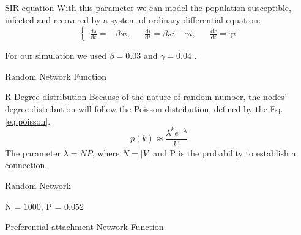 \documentclass{beamer}
\begin{document}
	\begin{frame}{SIR equation}
	    With this parameter we can model the population susceptible, infected and recovered by a system of ordinary differential equation:
	    \begin{equation}\label{eq:diffEq}
          \left\{
            \begin{matrix}
                \frac{\mathrm{d} s}{\mathrm{d} t} = -\beta si, &&
                \frac{\mathrm{d} i}{\mathrm{d} t} = \beta si - \gamma i, &&
                \frac{\mathrm{d} r}{\mathrm{d} t} = \gamma i
            \end{matrix}\right.
        \end{equation}
        \begin{center}
		\end{center}
		
		For our simulation we used $\beta = 0.03$ and $\gamma = 0.04$ .
	\end{frame}
	
	\begin{frame}{Random Network Function}
        \begin{adjustwidth}{-1cm}{-1cm}
		\end{adjustwidth}
	\end{frame}
	
	\begin{frame}{R Degree distribution}
		Because of the nature of random number, the nodes' degree distribution will follow the Poisson distribution, defined by the Eq.\ref{eq:poisson}.
        \begin{equation}\label{eq:poisson}
          p(k) \approx \frac{\lambda^ke^{-\lambda}}{k!}
        \end{equation}
        The parameter $\lambda = N P$, where $N = |V|$ and P is the probability to establish a connection. 
        
        \begin{left}
		\end{left}
	\end{frame}
	\begin{frame}{Random Network}
	    \begin{center}
		\end{center}
	    \footnotesize{
		    N = 1000,
		    P = 0.052
		}
	\end{frame}
	
	\begin{frame}{Preferential attachment Network Function}
        \begin{adjustwidth}{-1cm}{-1cm}
		\end{adjustwidth}
	\end{frame}
	
\end{document}
